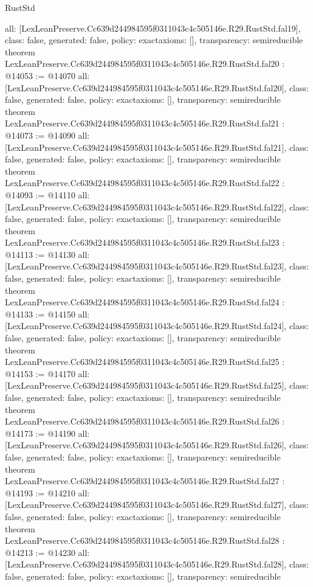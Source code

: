 \begin{lexlean}{RustStd}
\begin{coremodule}
{  all: [LexLeanPreserve.Cc639d244984595f0311043c4c505146e.R29.RustStd.fal19],
  class: false,
  generated: false,
  policy: exact{axioms: []},
  transparency: semireducible
}
theorem LexLeanPreserve.Cc639d244984595f0311043c4c505146e.R29.RustStd.fal20 : @14053 := @14070 {
  all: [LexLeanPreserve.Cc639d244984595f0311043c4c505146e.R29.RustStd.fal20],
  class: false,
  generated: false,
  policy: exact{axioms: []},
  transparency: semireducible
}
theorem LexLeanPreserve.Cc639d244984595f0311043c4c505146e.R29.RustStd.fal21 : @14073 := @14090 {
  all: [LexLeanPreserve.Cc639d244984595f0311043c4c505146e.R29.RustStd.fal21],
  class: false,
  generated: false,
  policy: exact{axioms: []},
  transparency: semireducible
}
theorem LexLeanPreserve.Cc639d244984595f0311043c4c505146e.R29.RustStd.fal22 : @14093 := @14110 {
  all: [LexLeanPreserve.Cc639d244984595f0311043c4c505146e.R29.RustStd.fal22],
  class: false,
  generated: false,
  policy: exact{axioms: []},
  transparency: semireducible
}
theorem LexLeanPreserve.Cc639d244984595f0311043c4c505146e.R29.RustStd.fal23 : @14113 := @14130 {
  all: [LexLeanPreserve.Cc639d244984595f0311043c4c505146e.R29.RustStd.fal23],
  class: false,
  generated: false,
  policy: exact{axioms: []},
  transparency: semireducible
}
theorem LexLeanPreserve.Cc639d244984595f0311043c4c505146e.R29.RustStd.fal24 : @14133 := @14150 {
  all: [LexLeanPreserve.Cc639d244984595f0311043c4c505146e.R29.RustStd.fal24],
  class: false,
  generated: false,
  policy: exact{axioms: []},
  transparency: semireducible
}
theorem LexLeanPreserve.Cc639d244984595f0311043c4c505146e.R29.RustStd.fal25 : @14153 := @14170 {
  all: [LexLeanPreserve.Cc639d244984595f0311043c4c505146e.R29.RustStd.fal25],
  class: false,
  generated: false,
  policy: exact{axioms: []},
  transparency: semireducible
}
theorem LexLeanPreserve.Cc639d244984595f0311043c4c505146e.R29.RustStd.fal26 : @14173 := @14190 {
  all: [LexLeanPreserve.Cc639d244984595f0311043c4c505146e.R29.RustStd.fal26],
  class: false,
  generated: false,
  policy: exact{axioms: []},
  transparency: semireducible
}
theorem LexLeanPreserve.Cc639d244984595f0311043c4c505146e.R29.RustStd.fal27 : @14193 := @14210 {
  all: [LexLeanPreserve.Cc639d244984595f0311043c4c505146e.R29.RustStd.fal27],
  class: false,
  generated: false,
  policy: exact{axioms: []},
  transparency: semireducible
}
theorem LexLeanPreserve.Cc639d244984595f0311043c4c505146e.R29.RustStd.fal28 : @14213 := @14230 {
  all: [LexLeanPreserve.Cc639d244984595f0311043c4c505146e.R29.RustStd.fal28],
  class: false,
  generated: false,
  policy: exact{axioms: []},
  transparency: semireducible
}
\end{coremodule}
\end{lexlean}
